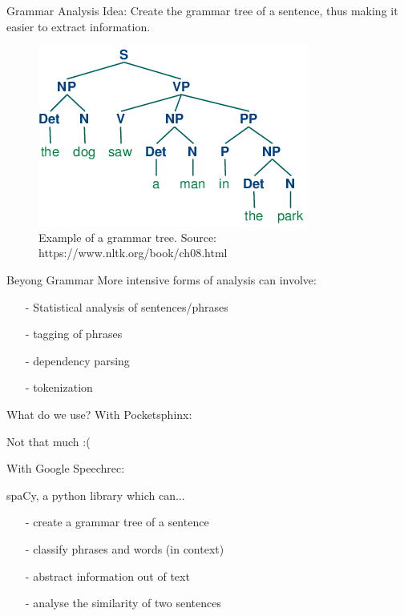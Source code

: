 \documentclass{beamer}
\begin{document}
	\begin{frame}{Grammar Analysis}
		Idea: Create the grammar tree of a sentence, thus making it easier to extract information.
		
		\begin{figure}[ht]
			\centering
			\includegraphics[width=.7\linewidth]{Bilder/grammar_tree.png}
			\caption{Example of a grammar tree. Source: https://www.nltk.org/book/ch08.html}
		\end{figure}
		
	\end{frame}
	
	\begin{frame}{Beyong Grammar}
		More intensive forms of analysis can involve:
		\begin{itemize}
			\item[-] Statistical analysis of sentences/phrases
			\item[-] tagging of phrases
			\item[-] dependency parsing
			\item[-] tokenization
		\end{itemize} 
	\end{frame}
	
	\begin{frame}{What do we use?}
		With Pocketsphinx: 
		
		\pause
		Not that much :(
		
		With Google Speechrec:
		
		\pause
		spaCy, a python library which can...
		\begin{itemize}
			\item[-] create a grammar tree of a sentence
			\item[-] classify phrases and words (in context)
			\item[-] abstract information out of text
			\item[-] analyse the similarity of two sentences
		\end{itemize}
	\end{frame}
	
\end{document}
